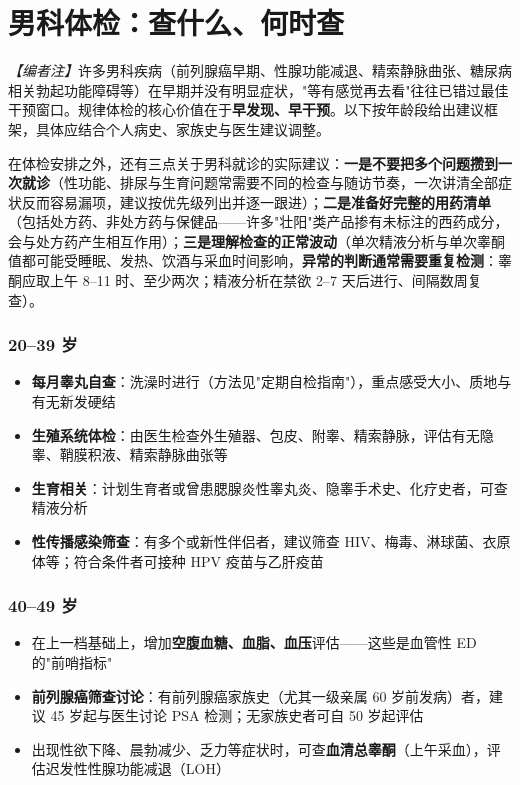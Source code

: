 \section{男科体检：查什么、何时查}

\noindent\textit{【编者注】}许多男科疾病（前列腺癌早期、性腺功能减退、精索静脉曲张、糖尿病相关勃起功能障碍等）在早期并没有明显症状，"等有感觉再去看"往往已错过最佳干预窗口。规律体检的核心价值在于\textbf{早发现、早干预}。以下按年龄段给出建议框架，具体应结合个人病史、家族史与医生建议调整。


在体检安排之外，还有三点关于男科就诊的实际建议：\textbf{一是不要把多个问题攒到一次就诊}（性功能、排尿与生育问题常需要不同的检查与随访节奏，一次讲清全部症状反而容易漏项，建议按优先级列出并逐一跟进）；\textbf{二是准备好完整的用药清单}（包括处方药、非处方药与保健品——许多"壮阳"类产品掺有未标注的西药成分，会与处方药产生相互作用）；\textbf{三是理解检查的正常波动}（单次精液分析与单次睾酮值都可能受睡眠、发热、饮酒与采血时间影响，\textbf{异常的判断通常需要重复检测}：睾酮应取上午 8--11 时、至少两次；精液分析在禁欲 2--7 天后进行、间隔数周复查）。

\subsubsection{20--39 岁}

\begin{itemize}
	\item \textbf{每月睾丸自查}：洗澡时进行（方法见"定期自检指南"），重点感受大小、质地与有无新发硬结
	\item \textbf{生殖系统体检}：由医生检查外生殖器、包皮、附睾、精索静脉，评估有无隐睾、鞘膜积液、精索静脉曲张等
	\item \textbf{生育相关}：计划生育者或曾患腮腺炎性睾丸炎、隐睾手术史、化疗史者，可查精液分析
	\item \textbf{性传播感染筛查}：有多个或新性伴侣者，建议筛查 HIV、梅毒、淋球菌、衣原体等；符合条件者可接种 HPV 疫苗与乙肝疫苗
\end{itemize}

\subsubsection{40--49 岁}

\begin{itemize}
	\item 在上一档基础上，增加\textbf{空腹血糖、血脂、血压}评估——这些是血管性 ED 的"前哨指标"
	\item \textbf{前列腺癌筛查讨论}：有前列腺癌家族史（尤其一级亲属 60 岁前发病）者，建议 45 岁起与医生讨论 PSA 检测；无家族史者可自 50 岁起评估
	\item 出现性欲下降、晨勃减少、乏力等症状时，可查\textbf{血清总睾酮}（上午采血），评估迟发性性腺功能减退（LOH）
\end{itemize}

